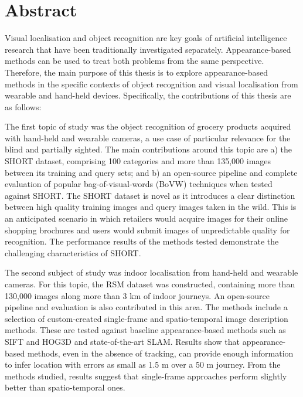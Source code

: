 \begingroup
\let\clearpage\relax
\let\cleardoublepage\relax
\let\cleardoublepage\relax

\chapter*{Abstract}

Visual localisation and object recognition are key goals of artificial intelligence research that have been traditionally investigated separately. Appearance-based methods can be used to treat both problems from the same perspective. Therefore, the main purpose of this thesis is to explore appearance-based methods in the specific contexts of object recognition and visual localisation from wearable and hand-held devices. Specifically, the contributions of this thesis are as follows:

The first topic of study was the object recognition of grocery products acquired with hand-held and wearable cameras, a use case of particular relevance for the blind and partially sighted. The main contributions around this topic are a) the SHORT dataset, comprising 100 categories and more than 135,000 images between its training and query sets; and b) an open-source pipeline and complete evaluation of popular bag-of-visual-words (BoVW) techniques when tested against SHORT. The SHORT dataset is novel as it introduces a clear distinction between high quality training images and query images taken in the wild. This is an anticipated scenario in which retailers would acquire images for their online shopping brochures and users would submit images of unpredictable quality for recognition. The performance results of the methods tested demonstrate the challenging characteristics of SHORT.

The second subject of study was indoor localisation from hand-held and wearable cameras. For this topic, the RSM dataset was constructed, containing more than 130,000 images along more than 3 km of indoor journeys. An open-source pipeline and evaluation is also contributed in this area. The methods include a selection of custom-created single-frame and spatio-temporal image description methods. These are tested against baseline appearance-based methods such as SIFT and HOG3D and state-of-the-art SLAM. Results show that appearance-based methods, even in the absence of tracking, can provide enough information to infer location with errors as small as 1.5 m over a 50 m journey. From the methods studied, results suggest that single-frame approaches perform slightly better than spatio-temporal ones.

